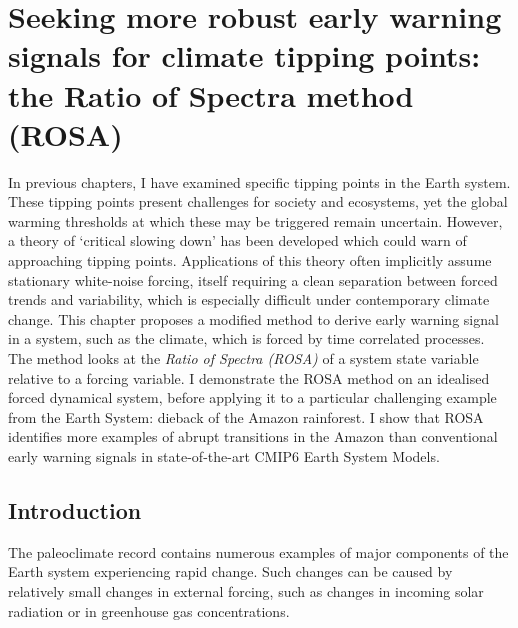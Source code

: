 \chapter{Seeking more robust early warning signals for climate tipping points: the Ratio of Spectra method (ROSA)}
\label{chapter:rosa}
\graphicspath{{ROSA/figs}}



In previous chapters, I have examined specific tipping points in the Earth system.
These tipping points present challenges for society and 
ecosystems, yet the global warming thresholds at which these may be triggered remain uncertain. However,
a theory of `critical slowing down' has been developed which could warn of approaching tipping points. 
Applications of this theory often implicitly assume stationary white-noise forcing,  itself requiring a clean separation
between forced trends and variability, which is especially difficult under contemporary climate change. 
This chapter proposes a modified method to derive early warning signal in a 
system, such as the climate, which is forced by time correlated processes. 
The method looks at the \emph{Ratio of Spectra (ROSA)} of a system state variable relative to a forcing variable.   
I demonstrate the ROSA method on an idealised forced dynamical system, before applying it 
to a particular challenging example from the Earth System: dieback of the Amazon rainforest.
I show that ROSA identifies more examples of abrupt transitions in the Amazon than conventional early warning signals in state-of-the-art CMIP6 Earth System Models.


\section{Introduction}\label{sec:introduction}
The paleoclimate record contains numerous examples \parencite{Brovkin2021} of 
major components of the Earth system experiencing rapid 
change. Such changes can be caused by 
relatively small changes in external forcing, such as changes in incoming
solar radiation or in greenhouse gas concentrations.

